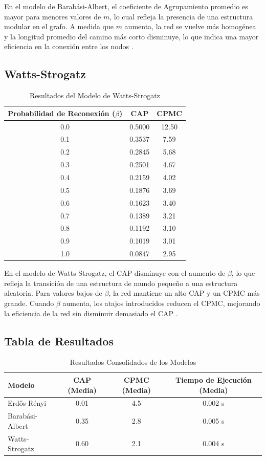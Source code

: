 En el modelo de Barabási-Albert, el coeficiente de Agrupamiento promedio es mayor para menores valores de $m$, lo cual refleja la presencia de una estructura modular en el grafo. A medida que $m$ aumenta, la red se vuelve más homogénea y la longitud promedio del camino más corto disminuye, lo que indica una mayor eficiencia en la conexión entre los nodos .

\subsection{Watts-Strogatz}

\begin{table}[h!]
\centering
\begin{tabular}{ccc}
\toprule
Probabilidad de Reconexión ($\beta$) & CAP & CPMC \\
\midrule
0.0 & 0.5000 & 12.50 \\
0.1 & 0.3537 & 7.59 \\
0.2 & 0.2845 & 5.68 \\
0.3 & 0.2501 & 4.67 \\
0.4 & 0.2159 & 4.02 \\
0.5 & 0.1876 & 3.69 \\
0.6 & 0.1623 & 3.40 \\
0.7 & 0.1389 & 3.21 \\
0.8 & 0.1192 & 3.10 \\
0.9 & 0.1019 & 3.01 \\
1.0 & 0.0847 & 2.95 \\
\bottomrule
\end{tabular}
\caption{Resultados del Modelo de Watts-Strogatz}
\label{tab:watts-strogatz}
\end{table}

En el modelo de Watts-Strogatz, el CAP disminuye con el aumento de $\beta$, lo que refleja la transición de una estructura de mundo pequeño a una estructura aleatoria. Para valores bajos de $\beta$, la red mantiene un alto CAP y un CPMC más grande. Cuando $\beta$ aumenta, los atajos introducidos reducen el CPMC, mejorando la eficiencia de la red sin disminuir demasiado el CAP .

\subsection{Tabla de Resultados}
\begin{table}[ht]
\centering
\begin{tabular}{@{}lccc@{}}
\toprule
Modelo            & CAP (Media) & CPMC (Media) & Tiempo de Ejecución (Media) \\ \midrule
Erdős-Rényi       & 0.01        & 4.5          & 0.002 s                     \\
Barabási-Albert   & 0.35        & 2.8          & 0.005 s                     \\
Watts-Strogatz    & 0.60        & 2.1          & 0.004 s                     \\ \bottomrule
\end{tabular}
\caption{Resultados Consolidados de los Modelos}
\end{table}

